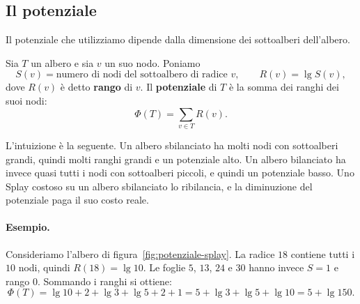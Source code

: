 \subsection{Il potenziale}
Il potenziale che utilizziamo dipende dalla dimensione dei sottoalberi dell'albero.

\begin{definizione}\label{def:rango}
Sia $T$ un albero e sia $v$ un suo nodo. Poniamo
\[
S(v) = \text{numero di nodi del sottoalbero di radice } v, \qquad R(v) = \lg S(v),
\]
dove $R(v)$ è detto \textbf{rango} di $v$. Il \textbf{potenziale} di $T$ è la somma dei ranghi dei suoi nodi:
\[
\Phi(T) = \sum_{v \in T} R(v).
\]
\end{definizione}

L'intuizione è la seguente. Un albero sbilanciato ha molti nodi con sottoalberi grandi, quindi molti ranghi grandi e un potenziale alto. Un albero bilanciato ha invece quasi tutti i nodi con sottoalberi piccoli, e quindi un potenziale basso. Uno Splay costoso su un albero sbilanciato lo ribilancia, e la diminuzione del potenziale paga il suo costo reale.

\paragraph{Esempio.}
Consideriamo l'albero di figura~\ref{fig:potenziale-splay}. La radice $18$ contiene tutti i $10$ nodi, quindi $R(18) = \lg 10$. Le foglie $5$, $13$, $24$ e $30$ hanno invece $S = 1$ e rango $0$. Sommando i ranghi si ottiene:
\[
\Phi(T) = \lg 10 + 2 + \lg 3 + \lg 5 + 2 + 1 = 5 + \lg 3 + \lg 5 + \lg 10 = 5 + \lg 150.
\]

